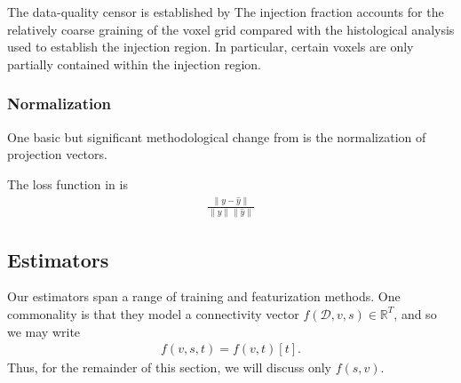 The data-quality censor is established by 
The injection fraction accounts for the relatively coarse graining of the voxel grid compared with the histological analysis used to establish the injection region.  In particular, certain voxels are only partially contained within the injection region.

\subsubsection{Normalization}

One basic but significant methodological change from \citet{Knox2019-ot} is the normalization of projection vectors.

\begin{comment}
\begin{figure}
    \centering
    \texttt{[image: ]}
    \caption{Caption}
    \label{fig:my_label}
\end{figure}
\end{comment}
The loss function in \citet{Knox2019-ot} is
\begin{eqnarray*}
\frac{\|y - \hat y\|} {\|y\|\|\hat y\|}
\end{eqnarray*}





\subsection{Estimators}

Our estimators span a range of training and featurization methods.
One commonality is that they model a connectivity vector $f (\mathcal D, v,s)  \in \mathbb R^T$, and so we may write
\begin{eqnarray*}
f (v,s,t) = f (v,t)[t].
\end{eqnarray*}
Thus, for the remainder of this section, we will discuss only $f (s,v)$.

